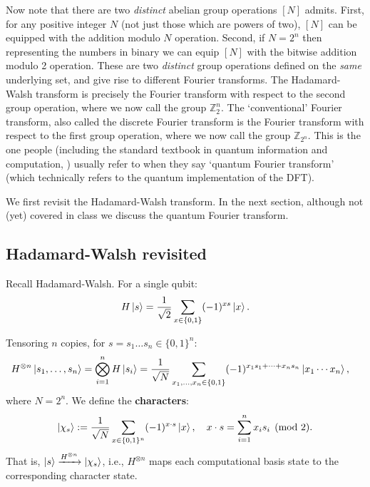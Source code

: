 Now note that there are two \textit{distinct} abelian group operations $[N]$ admits. First, for any positive integer $N$ (not just those which are powers of two), $[N]$ can be equipped with the addition modulo $N$ operation. Second, if $N=2^n$ then representing the numbers in binary we can equip $[N]$ with the bitwise addition modulo 2 operation. These are two \textit{distinct} group operations defined on the \textit{same} underlying set, and give rise to different Fourier transforms. The Hadamard-Walsh transform is precisely the Fourier transform with respect to the second group operation, where we now call the group $\mathbb{Z}_2^n$. The `conventional' Fourier transform, also called the discrete Fourier transform is the Fourier transform with respect to the first group operation, where we now call the group $\mathbb{Z}_{2^n}$. This is the one people (including the standard textbook in quantum information and computation, \cite{NC10}) usually refer to when they say `quantum Fourier transform' (which technically refers to the quantum implementation of the DFT). 

We first revisit the Hadamard-Walsh transform. In the next section, although not (yet) covered in class we discuss the quantum Fourier transform.

\subsection{Hadamard-Walsh revisited}
Recall Hadamard-Walsh. For a single qubit:
\begin{align*}
    H\ket{s} = \frac{1}{\sqrt{2}}\sum_{x \in \{0,1\}}(-1)^{xs}\ket{x}.
\end{align*}

Tensoring $n$ copies, for $s = s_1\dots s_n \in \{0,1\}^n$:
\begin{align*}
    H^{\otimes n}\ket{s_1,\ldots,s_n} &= \bigotimes_{i=1}^n H\ket{s_i} = \frac{1}{\sqrt{N}}\sum_{x_1,\ldots,x_n \in \{0,1\}}(-1)^{x_1 s_1 + \cdots + x_n s_n}\ket{x_1\cdots x_n},
\end{align*}
where $N = 2^n$. We define the \textbf{characters}:
\begin{align*}
    \ket{\chi_s} := \frac{1}{\sqrt{N}}\sum_{x \in \{0,1\}^n}(-1)^{x \cdot s}\ket{x}, \quad x \cdot s = \sum_{i=1}^n x_i s_i \pmod{2}.
\end{align*}
That is, $\ket{s} \xrightarrow{H^{\otimes n}} \ket{\chi_s}$, i.e., $H^{\otimes n}$ maps each computational basis state to the corresponding character state.

